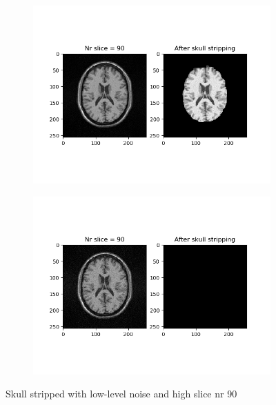 \begin{figure}[H]
	\centering
	\begin{subfigure}[b]{0.35\linewidth}
		\includegraphics[scale=0.35]{figures/Module_08/M8_10.png}
	\end{subfigure}
		\begin{subfigure}[b]{0.35\linewidth}
		\includegraphics[scale=0.35]{figures/Module_08/M8_n10.png}
	\end{subfigure}
	\caption{Skull stripped with low-level noise and high slice nr 90}
	\label{fig:figures/m08_10}
\end{figure}

